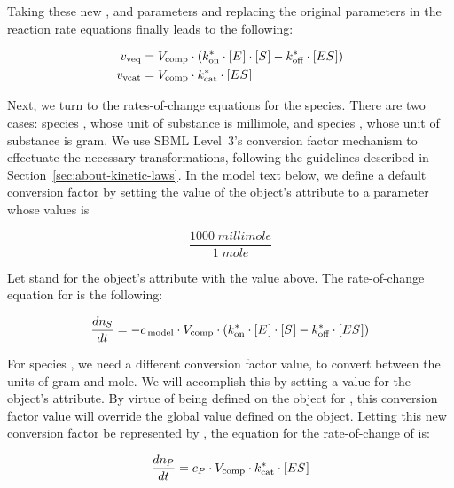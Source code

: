 \newcommand{\nS}{\ensuremath{n_{\mkern-1muS}}\xspace}
\newcommand{\nP}{\ensuremath{n_{\mkern-1muP}}\xspace}

Taking these new \konnew, \koffnew and \kcatnew parameters and
replacing the original parameters in the reaction rate equations
finally leads to the following:
\begin{linenomath}
  \begin{align*}
    v_\text{veq}  & = V_\text{comp} \cdot (k_\text{on}^{*} \cdot [E\mkern1mu] \cdot [S\mkern1mu] - k_\text{off}^{*} \cdot [ES\mkern1mu])\\
    v_\text{vcat} & = V_\text{comp} \cdot k_\text{cat}^{*} \cdot [ES\mkern1mu]
  \end{align*}
\end{linenomath}
Next, we turn to the rates-of-change equations for the species.
There are two cases: species , whose unit of substance
is \unit{millimole}, and species , whose unit of
substance is \unit{gram}.  We use SBML Level~3's conversion factor
mechanism to effectuate the necessary transformations, following
the guidelines described in Section~\ref{sec:about-kinetic-laws}.
In the model text below, we define a default conversion factor by
setting the value of the \Model object's 
attribute to a parameter whose values is
\begin{linenomath}
  \begin{equation*}
    \dfrac{1000 \; \unit{millimole}}{1 \; \unit{mole}}
  \end{equation*}
\end{linenomath}
Let \csg stand for the \Model object's 
attribute with the value above.  The rate-of-change equation for
 is the following:
\begin{linenomath}
  \begin{equation*}
    \dfrac{d \nS}{d t} = - \csg \cdot \Vcomp \cdot
    (\konnew \cdot \concent{E} \cdot \concent{S} - \koffnew \cdot \concent{ES})
  \end{equation*}
\end{linenomath}
For species , we need a different conversion factor
value, to convert between the units of \unit{gram} and
\unit{mole}.  We will accomplish this by setting a value for the
\Species object's  attribute.  By virtue
of being defined on the \Species object for , this
conversion factor value will override the global value defined on
the \Model object.  Letting this new conversion factor be
represented by \convP, the equation for the rate-of-change of
 is:
\begin{linenomath}
  \begin{equation*}
    \dfrac{d \nP}{d t} = \convP \cdot \Vcomp \cdot \kcatnew \cdot \concent{ES}
  \end{equation*}
\end{linenomath}

